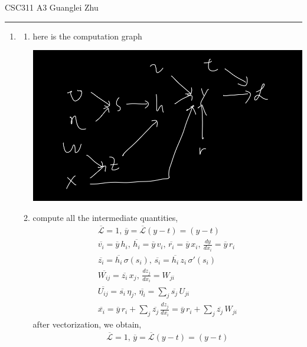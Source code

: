 \documentclass[12pt]{article}
\newcommand{\dd}[2]{\frac{d #1}{d #2}}
\begin{document}
  CSC311 A3
  \hfill
  Guanglei Zhu
  \smallskip
  \hrule
  \bigskip
  \begin{enumerate}
    \item \begin{enumerate}
      \item here is the computation graph \\
      \begin{center}
        \includegraphics[scale=0.3]{q1.jpg}
      \end{center}
      \item compute all the intermediate quantities, 
      \begin{gather*}
        \overline{\mathcal L} = 1,\, \overline{y} = \overline{\mathcal L} (y-t) = (y-t) \\
        \overline{v_i} = \overline{y} \, h_i ,\, \overline{h_i} = \overline{y} \, v_i,\, 
        \overline{r_i} = \overline{y} \, x_i,\, \dd{y}{x_i}  = \overline{y} \, r_i \\
        \overline{z_i} = \overline{h_i} \, \sigma(s_i),\, \overline{s_i} = \overline{h_i} \, z_i \, \sigma'(s_i) \\
        \overline{W_{ij}} = \overline{z_i} \, x_j ,\, \dd{z_j}{x_i} = W_{ji} \\
        \overline{U_{ij}} = \overline{s_i} \, \eta_j ,\, \overline{\eta_i} = \sum_{j} \overline{s_j} \, U_{ji} \\
        \overline{x_i} = \overline{y} \, r_i + \sum_{j} \overline{z_j} \, \dd{z_j}{x_i} = 
        \overline{y} \, r_i + \sum_{j} \overline{z_j} \, W_{ji}
      \end{gather*}
      after vectorization, we obtain,
      \begin{gather*}
        \overline{\mathcal L} = 1,\, \overline{y} = \overline{\mathcal L} (y-t) = (y-t) \\

\end{gather*}
\end{enumerate}
\end{enumerate}
\end{document}
